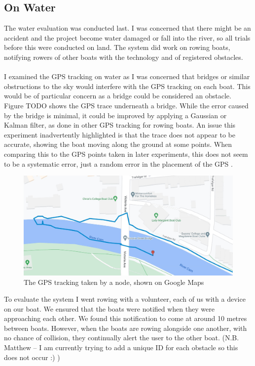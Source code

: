 \documentclass[12pt,a4paper]{report}
\begin{document}
\subsection{On Water} 
The water evaluation was conducted last. I was concerned that there might be an accident and the project become water damaged or fall into the river, so all trials before this were conducted on land. The system did work on rowing boats, notifying rowers of other boats with the technology and of registered obstacles. \\ \\
I examined the GPS tracking on water as I was concerned that bridges or similar obstructions to the sky would interfere with the GPS tracking on each boat. This would be of particular concern as a bridge could be considered an obstacle. Figure TODO shows the GPS trace underneath a bridge. While the error caused by the bridge is minimal, it could be improved by applying a Gaussian or Kalman filter, as done in other GPS tracking for rowing boats. An issue this experiment inadvertently highlighted is that the trace does not appear to be accurate, showing the boat moving along the ground at some points. When comparing this to the GPS points taken in later experiments, this does not seem to be a systematic error, just a random error in the placement of the GPS . 
\begin{figure}[h]
\begin{center}
\includegraphics[scale=0.3]{bridgeGPS.jpg}
\end{center}
\caption{The GPS tracking taken by a node, shown on Google Maps \cite{googlemapsgeneral}}
\end{figure}
To evaluate the system I went rowing with a volunteer, each of us with a device on our boat. We ensured that the boats were notified when they were approaching each other. We found this notification to come at around 10 metres between boats. However, when the boats are rowing alongside one another, with no chance of collision, they continually alert the user to the other boat. (N.B. Matthew -- I am currently trying to add a unique ID for each obstacle so this does not occur :) )\\ \\ 
\end{document}
